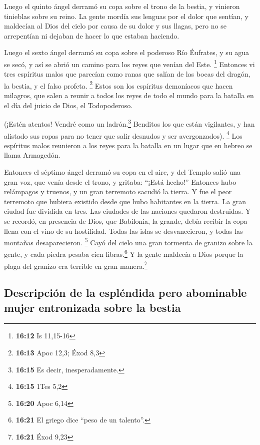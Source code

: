 Luego el quinto ángel derramó su copa sobre el trono de
la bestia, y vinieron tinieblas sobre su reino. La gente mordía sus
lenguas por el dolor que sentían,  y maldecían al Dios
del cielo por causa de su dolor y sus llagas, pero no se arrepentían ni
dejaban de hacer lo que estaban haciendo.

 Luego el sexto ángel derramó su copa sobre el poderoso
Río Éufrates, y su agua se secó, y así se abrió un camino para los reyes
que venían del Este. \footnote{\textbf{16:12} Is 11,15-16}
 Entonces vi tres espíritus malos que parecían como ranas
que salían de las bocas del dragón, la bestia, y el falso profeta.
\footnote{\textbf{16:13} Apoc 12,3; Éxod 8,3}  Estos son
los espíritus demoníacos que hacen milagros, que salen a reunir a todos
los reyes de todo el mundo para la batalla en el día del juicio de Dios,
el Todopoderoso.

 (¡Estén atentos! Vendré como un ladrón.\footnote{\textbf{16:15}
  Es decir, inesperadamente.} Benditos los que están vigilantes, y han
alistado sus ropas para no tener que salir desnudos y ser avergonzados).
\footnote{\textbf{16:15} 1Tes 5,2}  Los espíritus malos
reunieron a los reyes para la batalla en un lugar que en hebreo se llama
Armagedón.

 Entonces el séptimo ángel derramó su copa en el aire, y
del Templo salió una gran voz, que venía desde el trono, y gritaba:
``¡Está hecho!''  Entonces hubo relámpagos y truenos, y
un gran terremoto sacudió la tierra. Y fue el peor terremoto que hubiera
existido desde que hubo habitantes en la tierra.  La gran
ciudad fue dividida en tres. Las ciudades de las naciones quedaron
destruidas. Y se recordó, en presencia de Dios, que Babilonia, la
grande, debía recibir la copa llena con el vino de su hostilidad.
 Todas las islas se desvanecieron, y todas las montañas
desaparecieron. \footnote{\textbf{16:20} Apoc 6,14}  Cayó
del cielo una gran tormenta de granizo sobre la gente, y cada piedra
pesaba cien libras.\footnote{\textbf{16:21} El griego dice ``peso de un
  talento''.} Y la gente maldecía a Dios porque la plaga del granizo era
terrible en gran manera.\footnote{\textbf{16:21} Éxod 9,23}

\hypertarget{descripciuxf3n-de-la-espluxe9ndida-pero-abominable-mujer-entronizada-sobre-la-bestia}{%
\subsection{Descripción de la espléndida pero abominable mujer
entronizada sobre la
bestia}\label{descripciuxf3n-de-la-espluxe9ndida-pero-abominable-mujer-entronizada-sobre-la-bestia}}

